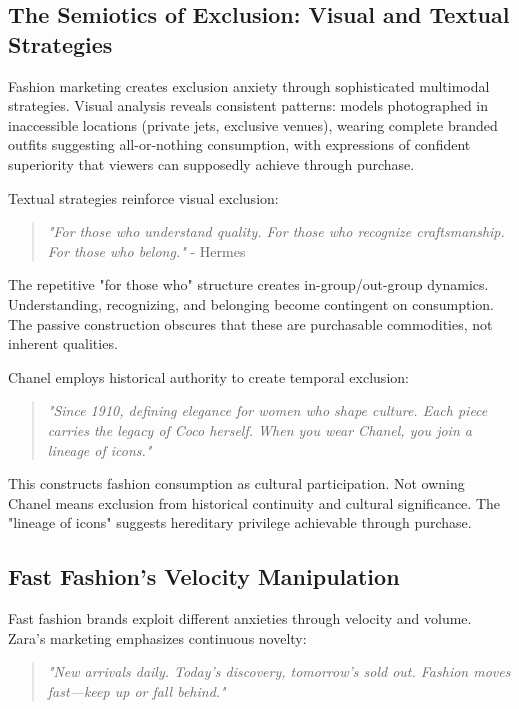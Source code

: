 \subsection{The Semiotics of Exclusion: Visual and Textual Strategies}

Fashion marketing creates exclusion anxiety through sophisticated multimodal strategies. Visual analysis reveals consistent patterns: models photographed in inaccessible locations (private jets, exclusive venues), wearing complete branded outfits suggesting all-or-nothing consumption, with expressions of confident superiority that viewers can supposedly achieve through purchase.

Textual strategies reinforce visual exclusion:

\begin{quote}
\textit{"For those who understand quality. For those who recognize craftsmanship. For those who belong."} - Hermes
\end{quote}

The repetitive "for those who" structure creates in-group/out-group dynamics. Understanding, recognizing, and belonging become contingent on consumption. The passive construction obscures that these are purchasable commodities, not inherent qualities.

Chanel employs historical authority to create temporal exclusion:

\begin{quote}
\textit{"Since 1910, defining elegance for women who shape culture. Each piece carries the legacy of Coco herself. When you wear Chanel, you join a lineage of icons."}
\end{quote}

This constructs fashion consumption as cultural participation. Not owning Chanel means exclusion from historical continuity and cultural significance. The "lineage of icons" suggests hereditary privilege achievable through purchase.

\subsection{Fast Fashion's Velocity Manipulation}

Fast fashion brands exploit different anxieties through velocity and volume. Zara's marketing emphasizes continuous novelty:

\begin{quote}
\textit{"New arrivals daily. Today's discovery, tomorrow's sold out. Fashion moves fast—keep up or fall behind."}
\end{quote}

